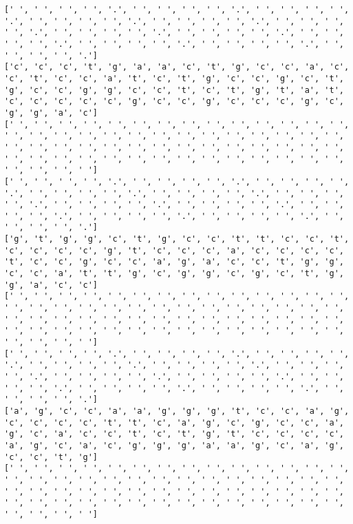 \documentclass{article}
\begin{document}
\begin{Verbatim}
[' ', ' ', ' ', ' ', '.', ' ', ' ', ' ', ' ', '.', ' ', ' ', ' ', ' ', '.', ' ', ' ', ' ', ' ', '.', ' ', ' ', ' ', ' ', '.', ' ', ' ', ' ', ' ', '.', ' ', ' ', ' ', ' ', '.', ' ', ' ', ' ', ' ', '.', ' ', ' ', ' ', ' ', '.', ' ', ' ', ' ', ' ', '.', ' ', ' ', ' ', ' ', '.', ' ', ' ', ' ', ' ', '.']
['c', 'c', 'c', 't', 'g', 'a', 'a', 'c', 't', 'g', 'c', 'c', 'a', 'c', 'c', 't', 'c', 'c', 'a', 't', 'c', 't', 'g', 'c', 'c', 'g', 'c', 't', 'g', 'c', 'c', 'g', 'g', 'c', 'c', 't', 'c', 't', 'g', 't', 'a', 't', 'c', 'c', 'c', 'c', 'c', 'g', 'c', 'c', 'g', 'c', 'c', 'c', 'g', 'c', 'g', 'g', 'a', 'c']
[' ', ' ', ' ', ' ', ' ', ' ', ' ', ' ', ' ', ' ', ' ', ' ', ' ', ' ', ' ', ' ', ' ', ' ', ' ', ' ', ' ', ' ', ' ', ' ', ' ', ' ', ' ', ' ', ' ', ' ', ' ', ' ', ' ', ' ', ' ', ' ', ' ', ' ', ' ', ' ', ' ', ' ', ' ', ' ', ' ', ' ', ' ', ' ', ' ', ' ', ' ', ' ', ' ', ' ', ' ', ' ', ' ', ' ', ' ', ' ']
[' ', ' ', ' ', ' ', '.', ' ', ' ', ' ', ' ', '.', ' ', ' ', ' ', ' ', '.', ' ', ' ', ' ', ' ', '.', ' ', ' ', ' ', ' ', '.', ' ', ' ', ' ', ' ', '.', ' ', ' ', ' ', ' ', '.', ' ', ' ', ' ', ' ', '.', ' ', ' ', ' ', ' ', '.', ' ', ' ', ' ', ' ', '.', ' ', ' ', ' ', ' ', '.', ' ', ' ', ' ', ' ', '.']
['g', 't', 'g', 'g', 'c', 't', 'g', 'c', 'c', 't', 't', 'c', 'c', 't', 'c', 'c', 'c', 'c', 'g', 't', 'c', 'c', 'c', 'a', 'c', 'c', 'c', 'c', 't', 'c', 'c', 'g', 'c', 'c', 'a', 'g', 'a', 'c', 'c', 't', 'g', 'g', 'c', 'c', 'a', 't', 't', 'g', 'c', 'g', 'g', 'c', 'g', 'c', 't', 'g', 'g', 'a', 'c', 'c']
[' ', ' ', ' ', ' ', ' ', ' ', ' ', ' ', ' ', ' ', ' ', ' ', ' ', ' ', ' ', ' ', ' ', ' ', ' ', ' ', ' ', ' ', ' ', ' ', ' ', ' ', ' ', ' ', ' ', ' ', ' ', ' ', ' ', ' ', ' ', ' ', ' ', ' ', ' ', ' ', ' ', ' ', ' ', ' ', ' ', ' ', ' ', ' ', ' ', ' ', ' ', ' ', ' ', ' ', ' ', ' ', ' ', ' ', ' ', ' ']
[' ', ' ', ' ', ' ', '.', ' ', ' ', ' ', ' ', '.', ' ', ' ', ' ', ' ', '.', ' ', ' ', ' ', ' ', '.', ' ', ' ', ' ', ' ', '.', ' ', ' ', ' ', ' ', '.', ' ', ' ', ' ', ' ', '.', ' ', ' ', ' ', ' ', '.', ' ', ' ', ' ', ' ', '.', ' ', ' ', ' ', ' ', '.', ' ', ' ', ' ', ' ', '.', ' ', ' ', ' ', ' ', '.']
['a', 'g', 'c', 'c', 'a', 'a', 'g', 'g', 'g', 't', 'c', 'c', 'a', 'g', 'c', 'c', 'c', 'c', 't', 't', 'c', 'a', 'g', 'c', 'g', 'c', 'c', 'a', 'g', 'c', 'a', 'c', 'c', 't', 'c', 't', 'g', 't', 'c', 'c', 'c', 'c', 'a', 'g', 'c', 'a', 'c', 'g', 'g', 'g', 'a', 'a', 'g', 'c', 'a', 'g', 'c', 'c', 't', 'g']
[' ', ' ', ' ', ' ', ' ', ' ', ' ', ' ', ' ', ' ', ' ', ' ', ' ', ' ', ' ', ' ', ' ', ' ', ' ', ' ', ' ', ' ', ' ', ' ', ' ', ' ', ' ', ' ', ' ', ' ', ' ', ' ', ' ', ' ', ' ', ' ', ' ', ' ', ' ', ' ', ' ', ' ', ' ', ' ', ' ', ' ', ' ', ' ', ' ', ' ', ' ', ' ', ' ', ' ', ' ', ' ', ' ', ' ', ' ', ' ']

\end{Verbatim}
\end{document}

